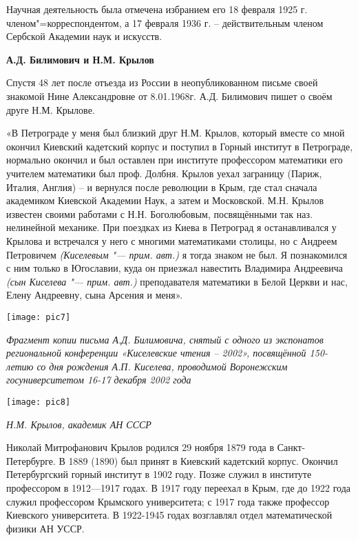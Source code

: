 Научная деятельность была отмечена избранием его 18 февраля 1925 г. членом"=корреспондентом, а 17 февраля 1936 г. – действительным членом Сербской Академии наук и искусств.

\begin{center}
{\bf А.Д. Билимович и Н.М. Крылов}
\end{center}

Спустя 48 лет после отъезда из России в неопубликованном письме своей знакомой Нине Александровне от 8.01.1968г. А.Д. Билимович пишет о своём друге Н.М. Крылове.

«В Петрограде у меня был близкий друг Н.М. Крылов, который вместе со мной окончил Киевский кадетский корпус и поступил в Горный институт в Петрограде, нормально окончил и был оставлен при институте профессором математики его учителем математики был проф. Долбня. Крылов уехал заграницу (Париж, Италия, Англия) – и вернулся после революции в Крым, где стал сначала академиком Киевской Академии Наук, а затем и Московской. М.Н. Крылов известен своими работами с Н.Н. Боголюбовым, посвящёнными так наз. нелинейной механике. При поездках из Киева в Петроград я останавливался у Крылова и встречался у него с многими математиками столицы, но с Андреем Петровичем \textit{(Киселевым "--- прим. авт.)} я тогда знаком не был. Я познакомился с ним только в Югославии, куда он приезжал навестить Владимира Андреевича \textit{(сын Киселева "--- прим. авт.)} преподавателя математики в Белой Церкви и нас, Елену Андреевну, сына Арсения и меня».

\begin{center}
\texttt{[image: pic7]}

{\it Фрагмент копии письма А.Д. Билимовича, снятый с одного из экспонатов региональной конференции «Киселевские чтения – 2002», посвящённой 150-летию со дня рождения А.П. Киселева, проводимой Воронежским госуниверситетом 16-17 декабря 2002 года}
\end{center}

\begin{center}
\texttt{[image: pic8]}

{\it Н.М. Крылов, академик АН СССР}
\end{center}

Николай Митрофанович Крылов родился 29 ноября 1879 года в Санкт-Петербурге. В 1889 (1890) был принят в Киевский кадетский корпус. Окончил Петербургский горный институт в 1902 году. Позже служил в институте профессором в 1912—1917 годах. В 1917 году переехал в Крым, где до 1922 года служил профессором Крымского университета; с 1917 года также профессор Киевского университета. В 1922-1945 годах возглавлял отдел математической физики АН УССР.

